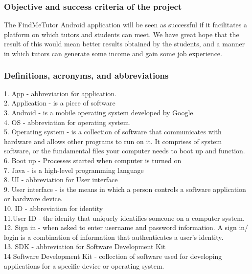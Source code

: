 \documentclass[12pt]{article}
\begin{document}
\subsubsection{Objective and success criteria of the project}
\begin{flushleft}
The FindMeTutor Android application will be seen as successful if it facilitates a platform on which tutors and students can meet. We have great hope that the result of this would mean better results obtained by the students, and a manner in which tutors can generate some income and gain some job experience. 
\end{flushleft}
\subsubsection{Definitions, acronyms, and abbreviations}
1. App - abbreviation for application. \\
2. Application - is a piece of software \\
3. Android - is a mobile operating system developed by Google. \\
4. OS - abbreviation for operating system.\\
5. Operating system - is a collection of software that communicates with hardware and allows other programs to run on it. It comprises  of system software, or the fundamental files your computer needs to boot up and function.\\
6. Boot up - Processes started when computer is turned on\\
7. Java - is a high-level programming language\\
8. UI - abbreviation for User interface\\
9. User interface - is the means in which a person controls a software application or hardware device.\\
10. ID - abbreviation for identity\\
11.User ID - the idenity that uniquely identifies someone on a computer system.\\
12. Sign in - when asked to enter username and password information. A sign in/ login is a combination of information that authenticates a user's identity. \\
13. SDK - abbreviation for Software Development Kit\\
14 Software Development Kit -  collection of software used for developing applications for a specific device or operating system.\\
 
\end{document}
